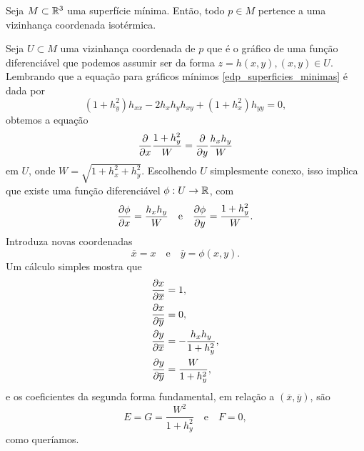

\begin{teorema}
	Seja $M \subset \mathbb{R}^3$ uma superfície mínima. Então, todo $p \in M$ pertence a uma vizinhança coordenada isotérmica.
\end{teorema}

\begin{demonstracao}
	Seja $U \subset M$ uma vizinhança coordenada de $p$ que é o gráfico de uma função diferenciável que podemos assumir ser da forma $z = h(x,y), (x,y) \in U$.
	Lembrando que a equação para gráficos mínimos \eqref{edp_superficies_minimas}  é dada por
	\begin{equation*}
	(1 + h_y^2) h_{xx} - 2 h_x h_y h_{xy} + (1 + h_x^2) h_{yy} = 0,
	\end{equation*}
	obtemos a equação
	\begin{equation*}
	\frac{\partial}{\partial x} \frac{1 + h_y^2}{W} = \frac{\partial}{\partial y} \frac{h_x h_y}{W}
	\end{equation*}
	em $U$, onde $W = \sqrt{1 + h_x^2 + h_y^2}$. Escolhendo $U$ simplesmente conexo, isso implica que existe uma função diferenciável $\phi: U \rightarrow \mathbb{R}$, com
	\begin{equation*}
	\frac{\partial \phi}{\partial x} = \frac{h_x h_y}{W} \quad \text{e} \quad
	\frac{\partial \phi}{\partial y} = \frac{1 + h_y^2}{W}.
	\end{equation*}
	Introduza novas coordenadas
	\begin{equation*}
	\overline{x} = x \quad \text{e} \quad
	\overline{y} = \phi(x,y).
	\end{equation*}
	Um cálculo simples mostra que
	\begin{align*}
	\frac{\partial x}{\partial \overline{x}} &= 1, \\
	\frac{\partial x}{\partial \overline{y}} &= 0, \\
	\frac{\partial y}{\partial \overline{x}} &= -\frac{h_x h_y}{1 + h_y^2}, \\
	\frac{\partial y}{\partial \overline{y}} &= \frac{W}{1 + h_y^2},
	\end{align*}
	e os coeficientes da segunda forma fundamental, em relação a $(\overline{x}, \overline{y})$, são
	\begin{equation*}
	E = G = \frac{W^2}{1 + h_y^2} \quad \text{e} \quad
	F = 0,
	\end{equation*}
	como queríamos.
\end{demonstracao}

